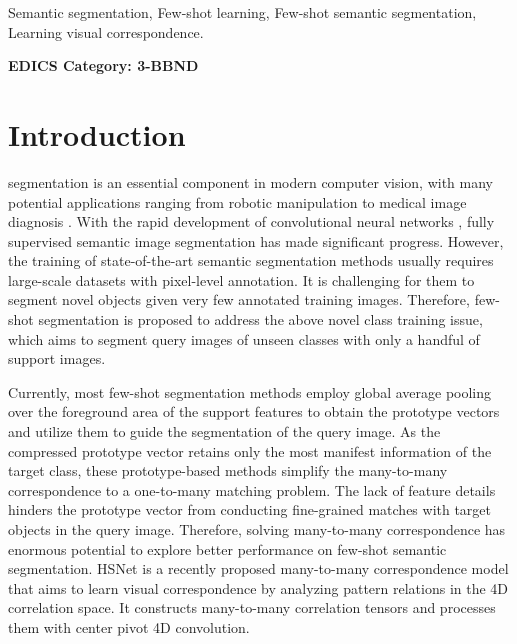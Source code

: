 \documentclass[journal]{IEEEtran}
\begin{document}
\begin{IEEEkeywords}
Semantic segmentation, Few-shot learning, Few-shot semantic segmentation, Learning visual correspondence.

\end{IEEEkeywords}




\ifCLASSOPTIONpeerreview
	\begin{center} \bfseries EDICS Category: 3-BBND \end{center}
\fi
\IEEEpeerreviewmaketitle


\section{Introduction}



 segmentation\cite{wang2019learning,kang2018depth, zhan2019unmanned, chen2021semantically, yao2021non, chen2022saliency} is an essential component in modern computer vision, with many potential applications ranging from robotic manipulation  \cite{wong2017segicp} to medical image diagnosis \cite{asgari2021deep}. With the rapid development of convolutional neural networks \cite{zhang2018multilabel, he2016deep, szegedy2017inception, szegedy2015going, yao2021jo, sun2022pnp, sun2021webly}, fully supervised semantic image segmentation has made significant progress. However, the training of state-of-the-art semantic segmentation methods usually requires large-scale datasets \cite{deng2009large, lin2014microsoft, yao2017exploiting} with pixel-level annotation. It is challenging for them \cite{lin2017refinenet} to segment novel objects given very few annotated training images. Therefore, few-shot segmentation \cite{wang2019panet, nguyen2019feature, xie2021scale, zhang2020sg, wang2020few} is proposed to address the above novel class training issue, which aims to segment query images of unseen classes with only a handful of support images.

Currently, most few-shot segmentation methods \cite{zhang2019canet, yang2020prototype, liu2021anti, zhang2020sg, chen2021semantically} employ global average pooling over the foreground area of the support features to obtain the prototype vectors and utilize them to guide the segmentation of the query image.
As the compressed prototype vector retains only the most manifest information of the target class, these prototype-based methods simplify the many-to-many correspondence to a one-to-many matching problem. The lack of feature details hinders the prototype vector from conducting fine-grained matches with target objects in the query image. Therefore, solving many-to-many correspondence has enormous potential to explore better performance on few-shot semantic segmentation. HSNet \cite{min2021hypercorrelation} is a recently proposed many-to-many correspondence model that aims to learn visual correspondence by analyzing pattern relations in the 4D correlation space. It constructs many-to-many correlation tensors and processes them with center pivot 4D convolution. 
\end{document}
